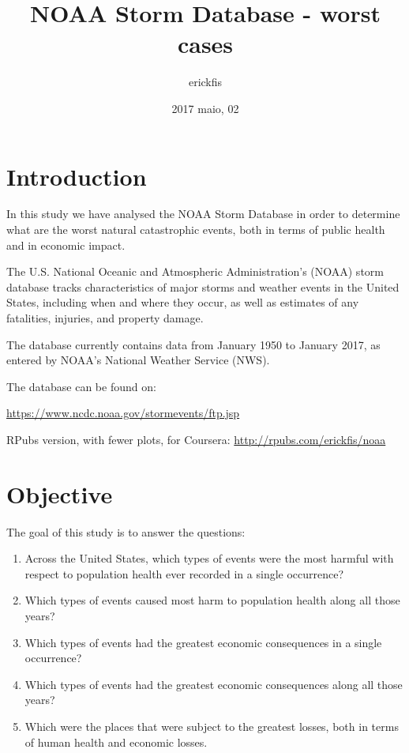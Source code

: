 \documentclass[]{article}
\title{NOAA Storm Database - worst cases}
\author{erickfis}
\date{2017 maio, 02}
\begin{document}
\maketitle

{
\setcounter{tocdepth}{3}
\tableofcontents
}
\section{Introduction}\label{introduction}

In this study we have analysed the NOAA Storm Database in order to
determine what are the worst natural catastrophic events, both in terms
of public health and in economic impact.

The U.S. National Oceanic and Atmospheric Administration's (NOAA) storm
database tracks characteristics of major storms and weather events in
the United States, including when and where they occur, as well as
estimates of any fatalities, injuries, and property damage.

The database currently contains data from January 1950 to January 2017,
as entered by NOAA's National Weather Service (NWS).

The database can be found on:

\url{https://www.ncdc.noaa.gov/stormevents/ftp.jsp}

RPubs version, with fewer plots, for Coursera:
\url{http://rpubs.com/erickfis/noaa}

\section{Objective}\label{objective}

The goal of this study is to answer the questions:

\begin{enumerate}
\def\labelenumi{\arabic{enumi}.}
\item
  Across the United States, which types of events were the most harmful
  with respect to population health ever recorded in a single
  occurrence?
\item
  Which types of events caused most harm to population health along all
  those years?
\item
  Which types of events had the greatest economic consequences in a
  single occurrence?
\item
  Which types of events had the greatest economic consequences along all
  those years?
\item
  Which were the places that were subject to the greatest losses, both
  in terms of human health and economic losses.
\end{enumerate}
\end{document}
